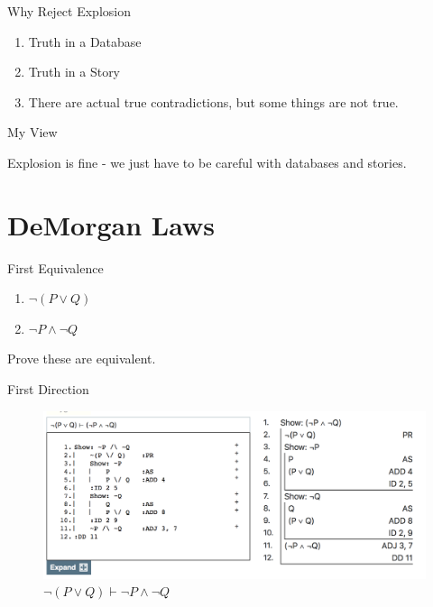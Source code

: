 \documentclass[
  ignorenonframetext,
]{beamer}
\providecommand{\tightlist}{%
  \setlength{\itemsep}{0pt}\setlength{\parskip}{0pt}}
\renewcommand{\,}{\text{, }}
\begin{document}
\begin{frame}{Why Reject Explosion}
\protect\hypertarget{why-reject-explosion}{}

\begin{enumerate}[<+->]
\tightlist
\item
  Truth in a Database
\item
  Truth in a Story
\item
  There are actual true contradictions, but some things are not true.
\end{enumerate}

\end{frame}

\begin{frame}{My View}
\protect\hypertarget{my-view}{}

Explosion is fine - we just have to be careful with databases and
stories.

\end{frame}

\hypertarget{demorgan-laws}{%
\section{DeMorgan Laws}\label{demorgan-laws}}

\begin{frame}{First Equivalence}
\protect\hypertarget{first-equivalence}{}

\begin{enumerate}
\tightlist
\item
  \(\neg (P \vee Q)\)
\item
  \(\neg P \wedge \neg Q\)
\end{enumerate}

Prove these are equivalent.

\end{frame}

\begin{frame}{First Direction}
\protect\hypertarget{first-direction}{}

\begin{figure}
\centering
\includegraphics{../images/class05/Class-05-7.png}
\caption{\(\neg (P \vee Q) \vdash \neg P \wedge \neg Q\)}
\end{figure}

\end{frame}
\end{document}
